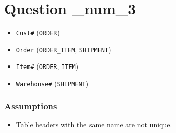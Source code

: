 \documentclass{article}
\begin{document}
\section*{Question \_num_3}
\begin{itemize}
    \item \verb|Cust#| (\verb|ORDER|)
    \item \verb|Order| (\verb|ORDER_ITEM|, \verb|SHIPMENT|)
    \item \verb|Item#| (\verb|ORDER|, \verb|ITEM|)
    \item \verb|Warehouse#| (\verb|SHIPMENT|)
\end{itemize}

\subsubsection*{Assumptions}
\begin{itemize}
    \item Table headers with the same name are not unique.
\end{itemize}
\end{document}
